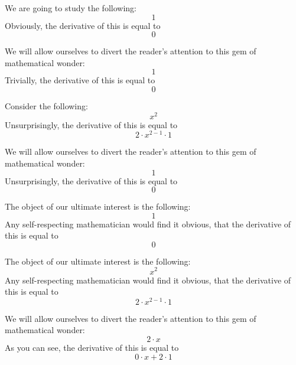 \documentclass{article}
\begin{document}
We are going to study the following:
\begin{equation}
1 
\end{equation}
Obviously, the derivative of this is equal to
\begin{equation}
0 
\end{equation}

We will allow ourselves to divert the reader's attention to this gem of mathematical wonder:
\begin{equation}
1 
\end{equation}
Trivially, the derivative of this is equal to
\begin{equation}
0 
\end{equation}

Consider the following:
\begin{equation}
x ^{2 } 
\end{equation}
Unsurprisingly, the derivative of this is equal to
\begin{equation}
2 \cdot x ^{2 - 1 } \cdot 1 
\end{equation}

We will allow ourselves to divert the reader's attention to this gem of mathematical wonder:
\begin{equation}
1 
\end{equation}
Unsurprisingly, the derivative of this is equal to
\begin{equation}
0 
\end{equation}

The object of our ultimate interest is the following:
\begin{equation}
1 
\end{equation}
Any self-respecting mathematician would find it obvious, that the derivative of this is equal to
\begin{equation}
0 
\end{equation}

The object of our ultimate interest is the following:
\begin{equation}
x ^{2 } 
\end{equation}
Any self-respecting mathematician would find it obvious, that the derivative of this is equal to
\begin{equation}
2 \cdot x ^{2 - 1 } \cdot 1 
\end{equation}

We will allow ourselves to divert the reader's attention to this gem of mathematical wonder:
\begin{equation}
2 \cdot x 
\end{equation}
As you can see, the derivative of this is equal to
\begin{equation}
0 \cdot x + 2 \cdot 1 
\end{equation}
\end{document}

